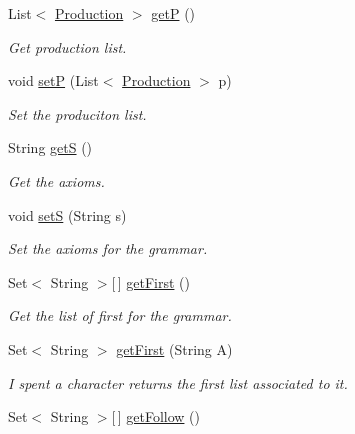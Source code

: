 \begin{DoxyCompactItemize}
List$<$ \hyperlink{classcontext_free_1_1grammar_1_1_production}{Production} $>$ \hyperlink{classcontext_free_1_1grammar_1_1_context_free_grammar_ad00a00b018844cf2acb0c1c5f5d97468}{get\-P} ()
\begin{DoxyCompactList}\small\item\em Get production list. \end{DoxyCompactList}\item 
void \hyperlink{classcontext_free_1_1grammar_1_1_context_free_grammar_a2a66695521702040224c23898b579c92}{set\-P} (List$<$ \hyperlink{classcontext_free_1_1grammar_1_1_production}{Production} $>$ p)
\begin{DoxyCompactList}\small\item\em Set the produciton list. \end{DoxyCompactList}\item 
String \hyperlink{classcontext_free_1_1grammar_1_1_context_free_grammar_ad278c4f5e2bdec1d011d11a3008d8754}{get\-S} ()
\begin{DoxyCompactList}\small\item\em Get the axioms. \end{DoxyCompactList}\item 
void \hyperlink{classcontext_free_1_1grammar_1_1_context_free_grammar_a2f4c3ec7270d799ed127cb162e0213b3}{set\-S} (String s)
\begin{DoxyCompactList}\small\item\em Set the axioms for the grammar. \end{DoxyCompactList}\item 
Set$<$ String $>$\mbox{[}$\,$\mbox{]} \hyperlink{classcontext_free_1_1grammar_1_1_context_free_grammar_adc3a25917132474960be34329cdaead9}{get\-First} ()
\begin{DoxyCompactList}\small\item\em Get the list of first for the grammar. \end{DoxyCompactList}\item 
Set$<$ String $>$ \hyperlink{classcontext_free_1_1grammar_1_1_context_free_grammar_a2140cdc636585e9714e8dc42c936eee5}{get\-First} (String A)
\begin{DoxyCompactList}\small\item\em I spent a character returns the first list associated to it. \end{DoxyCompactList}\item 
Set$<$ String $>$\mbox{[}$\,$\mbox{]} \hyperlink{classcontext_free_1_1grammar_1_1_context_free_grammar_a5dae0e5de95349d310869fb5941cb5be}{get\-Follow} ()

\end{DoxyCompactItemize}
